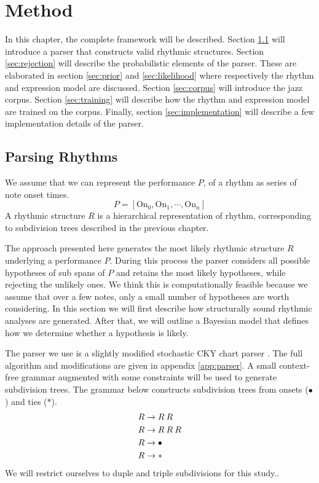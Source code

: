 \chapter{Method}
\label{sec:method}

In this chapter, the complete framework will be described. Section \ref{sec:parser} will introduce a parser that constructs valid rhythmic structures. Section \ref{sec:rejection} will describe the probabilistic elements of the parser. These are elaborated in section \ref{sec:prior} and \ref{sec:likelihood} where respectively the rhythm and expression model are discussed. Section \ref{sec:corpus} will introduce the jazz corpus. Section \ref{sec:training} will describe how the rhythm and expression model are trained on the corpus. Finally, section \ref{sec:implementation} will describe a few implementation details of the parser.

\section{Parsing Rhythms}
\label{sec:parser}

We assume that we can represent the performance $P$, of a rhythm as series of note onset times. 
\begin{equation}
\label{eq:performance}
P = [\mathrm{On}_0, \mathrm{On}_1, \cdots, \mathrm{On}_n]
\end{equation}
A rhythmic structure $R$ is a hierarchical representation of rhythm, corresponding to subdivision trees described in the previous chapter.

The approach presented here generates the most likely rhythmic structure $R$ underlying a performance $P$. During this process the parser considers all possible hypotheses of sub spans of $P$ and retains the most likely hypotheses, while rejecting the unlikely ones. We think this is computationally feasible because we assume that over a few notes, only a small number of hypotheses are worth considering. In this section we will first describe how structurally sound rhythmic analyses are generated. After that, we will outline a Bayesian model that defines how we determine whether a hypothesis is likely.

The parser we use is a slightly modified stochastic CKY chart parser \citep{Younger1967recognition}. The full algorithm and modifications are given in appendix \ref{app:parser}. A small context-free grammar augmented with some constraints will be used to generate subdivision trees. The grammar below constructs subdivision trees from onsets ($\bullet$) and ties ($*$).
\begin{align}
R &\rightarrow R\: R\\ \notag
R &\rightarrow R\: R\: R\\ \notag
R &\rightarrow \bullet\\ \notag
R &\rightarrow * \notag
\end{align}
We will restrict ourselves to duple and triple subdivisions for this study..

